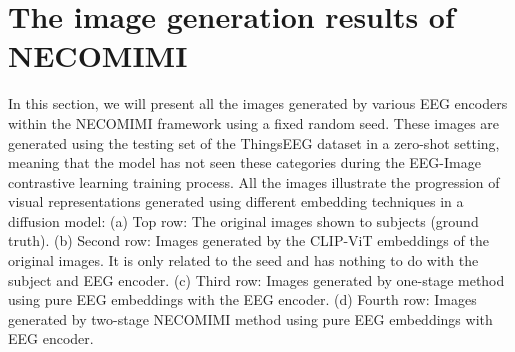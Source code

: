 \documentclass{article}
\begin{document}
\section{The image generation results of NECOMIMI}
In this section, we will present all the images generated by various EEG encoders within the NECOMIMI framework using a fixed random seed. These images are generated using the testing set of the ThingsEEG dataset in a zero-shot setting, meaning that the model has not seen these categories during the EEG-Image contrastive learning training process. All the images illustrate the progression of visual representations generated using different embedding techniques in a diffusion model: (a) Top row: The original images shown to subjects (ground truth). (b) Second row: Images generated by the CLIP-ViT embeddings of the original images. It is only related to the seed and has nothing to do with the subject and EEG encoder. (c) Third row: Images generated by one-stage method using pure EEG embeddings with the EEG encoder. (d) Fourth row: Images generated by two-stage NECOMIMI method using pure EEG embeddings with EEG encoder.


\end{document}
